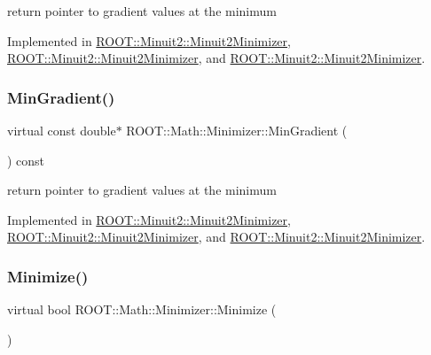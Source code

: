 return pointer to gradient values at the minimum 



Implemented in \mbox{\hyperlink{classROOT_1_1Minuit2_1_1Minuit2Minimizer_a52c6b3a13108b64366b1acd43f7e2b9a}{R\+O\+O\+T\+::\+Minuit2\+::\+Minuit2\+Minimizer}}, \mbox{\hyperlink{classROOT_1_1Minuit2_1_1Minuit2Minimizer_a52c6b3a13108b64366b1acd43f7e2b9a}{R\+O\+O\+T\+::\+Minuit2\+::\+Minuit2\+Minimizer}}, and \mbox{\hyperlink{classROOT_1_1Minuit2_1_1Minuit2Minimizer_a52c6b3a13108b64366b1acd43f7e2b9a}{R\+O\+O\+T\+::\+Minuit2\+::\+Minuit2\+Minimizer}}.

\mbox{\label{classROOT_1_1Math_1_1Minimizer_a861036d38a21d9a60d44e068397307af}} 
\subsubsection{\texorpdfstring{MinGradient()}{MinGradient()}\hspace{0.1cm}{\footnotesize\ttfamily [3/3]}}
{\footnotesize\ttfamily virtual const double$\ast$ R\+O\+O\+T\+::\+Math\+::\+Minimizer\+::\+Min\+Gradient (\begin{DoxyParamCaption}{ }\end{DoxyParamCaption}) const\hspace{0.3cm}{\ttfamily [pure virtual]}}



return pointer to gradient values at the minimum 



Implemented in \mbox{\hyperlink{classROOT_1_1Minuit2_1_1Minuit2Minimizer_a52c6b3a13108b64366b1acd43f7e2b9a}{R\+O\+O\+T\+::\+Minuit2\+::\+Minuit2\+Minimizer}}, \mbox{\hyperlink{classROOT_1_1Minuit2_1_1Minuit2Minimizer_a52c6b3a13108b64366b1acd43f7e2b9a}{R\+O\+O\+T\+::\+Minuit2\+::\+Minuit2\+Minimizer}}, and \mbox{\hyperlink{classROOT_1_1Minuit2_1_1Minuit2Minimizer_a52c6b3a13108b64366b1acd43f7e2b9a}{R\+O\+O\+T\+::\+Minuit2\+::\+Minuit2\+Minimizer}}.

\mbox{\label{classROOT_1_1Math_1_1Minimizer_a5f6a6307935a17fb13dac1ee7f1c41fd}} 
\subsubsection{\texorpdfstring{Minimize()}{Minimize()}\hspace{0.1cm}{\footnotesize\ttfamily [1/3]}}
{\footnotesize\ttfamily virtual bool R\+O\+O\+T\+::\+Math\+::\+Minimizer\+::\+Minimize (\begin{DoxyParamCaption}{ }\end{DoxyParamCaption})\hspace{0.3cm}{\ttfamily [pure virtual]}}



